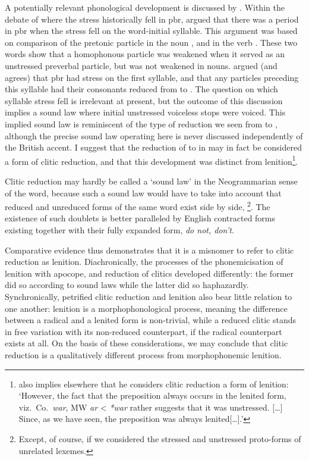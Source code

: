 A potentially relevant phonological development is discussed by \textcite[16--17]{schrijver_studies_1995}.
Within the debate of where the stress historically fell in \gls{pbr},  \textcite{thurneysen_zur_1883} argued that there was a period in \gls{pbr} when the stress fell on the word-initial syllable.
This argument was based on comparison of the pretonic particle  in the noun , and in the verb .
These two words show that a homophonous particle was weakened when it served as an unstressed preverbal particle, but was not weakened in nouns.
\Textcite{thurneysen_zur_1883} argued (and \textcite{schrijver_studies_1995} agrees) that \gls{pbr} had stress on the first syllable, and that any particles preceding this syllable had their consonants  reduced from  to .
The question on which syllable stress fell is irrelevant at present, but the outcome of this discussion implies a  sound law where initial unstressed voiceless stops were voiced.
This implied sound law is reminiscent of the type of reduction we seen from  to , although the precise sound law operating here is never discussed independently of the British accent.
I suggest that the reduction of  to  in  may in fact be considered a form of clitic reduction, and that this development was distinct from lenition\footnote{%
  \Textcite[125]{schrijver_studies_1995} also implies elsewhere that he considers clitic reduction a form of lenition: `However, the fact that the preposition always occurs in the lenited form, viz.\ Co.\ \textit{war}, MW \textit{ar} < \textit{*war} rather suggests that it was unstressed. […] Since, as we have seen, the preposition was always lenited[…].'}.

Clitic reduction may hardly be called a `sound law' in the Neogrammarian sense of the word, because such a sound law would have to take into account that reduced and unreduced forms of the same word  exist side by side, \eg {}\footnote{%
Except, of course, if we considered the stressed and unstressed proto-forms of  unrelated lexemes.
}.
The existence of such doublets is better paralleled by English contracted forms existing together with their fully expanded form, \eg \emph{do not, don't}.


Comparative evidence thus demonstrates that it is a misnomer to refer to clitic reduction as lenition.
Diachronically, the processes of the phonemicisation of lenition with apocope, and reduction of clitics developed differently: the former did so according to sound laws while the latter did so haphazardly.
Synchronically, petrified clitic reduction and lenition also bear little relation to one another: lenition is a morphophonological process, meaning the difference between a radical and a lenited form is non-trivial, while a reduced clitic stands in free variation with its non-reduced counterpart, if the radical counterpart exists at all. 
On the basis of these considerations, we may conclude that clitic reduction is a qualitatively different process from morphophonemic lenition. 

